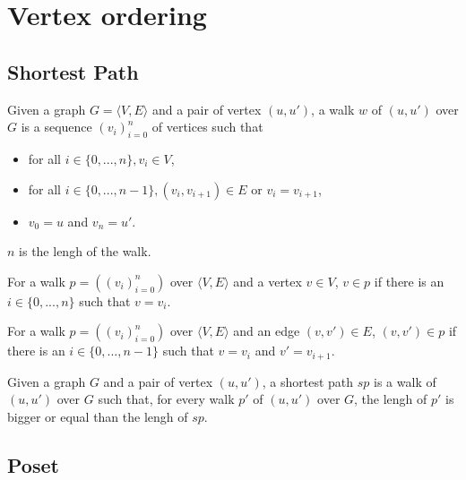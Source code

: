 \section{Vertex ordering}\label{sec:vo}

\subsection{Shortest Path}

\begin{definition}
  Given a graph $G=\langle V,E \rangle$ and a pair of vertex $(u,u')$,
  a walk $w$ of $(u,u')$ over $G$ is a sequence \((v_i)_{i=0}^{n}\) of vertices such that
  \begin{itemize}
  \item for all $i \in \{0,...,n\}, v_i \in V$,
  \item for all $i \in \{0,...,n-1\}, (v_i,v_{i+1}) \in E$ or $v_i=v_{i+1}$,
  \item $v_0 = u$ and $v_n=u'$.
  \end{itemize}
  $n$ is the lengh of the walk.
\end{definition}
\begin{definition}
For a walk $p=((v_i)_{i=0}^{n})$ over $\langle V,E \rangle$ and a vertex $v \in V$,
$v \in p$ if there is an $i\in \{0,...,n\}$ such that $v=v_i$.
\end{definition}
\begin{definition}
For a walk $p=((v_i)_{i=0}^{n})$ over $\langle V,E \rangle$ and an edge $(v,v') \in E$,
$(v,v') \in p$ if there is an $i\in \{0,...,n-1\}$ such that $v=v_i$ and $v'=v_{i+1}$.
\end{definition}
\begin{definition}
  Given a graph $G$ and a pair of vertex $(u,u')$,
  a shortest path $sp$ is a walk of $(u,u')$ over $G$ such that,
  for every walk $p'$ of $(u,u')$ over $G$,
  the lengh of $p'$ is bigger or equal than the lengh of $sp$.
\end{definition}

\subsection{Poset}

